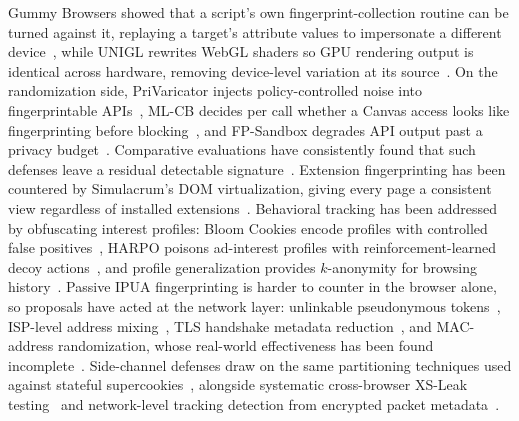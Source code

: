 %
Gummy Browsers showed that a script's own fingerprint-collection routine can be turned against it, replaying a target's attribute values to impersonate a different device~\cite{liuGummyBrowsersTargeted2022}, while UNIGL rewrites WebGL shaders so GPU rendering output is identical across hardware, removing device-level variation at its source~\cite{wuRenderedPrivateMaking2019}.
%
On the randomization side, PriVaricator injects policy-controlled noise into fingerprintable APIs~\cite{nikiforakisPriVaricatorDeceivingFingerprinters2015}, ML-CB decides per call whether a Canvas access looks like fingerprinting before blocking~\cite{reitingerMLCBMachineLearning2021}, and FP-Sandbox degrades API output past a privacy budget~\cite{torokOnlyPayWhat2023}.
%
Comparative evaluations have consistently found that such defenses leave a residual detectable signature~\cite{dattaEvaluatingAntiFingerprintingPrivacy2019}.
% 
Extension fingerprinting has been countered by Simulacrum's DOM virtualization, giving every page a consistent view regardless of installed extensions~\cite{karamiUnleashSimulacrumShifting2022}.
Behavioral tracking has been addressed by obfuscating interest profiles: Bloom Cookies encode profiles with controlled false positives~\cite{morBloomCookiesWeb2015}, HARPO poisons ad-interest profiles with reinforcement-learned decoy actions~\cite{zhangHARPOLearningSubvert2022}, and profile generalization provides $k$-anonymity for browsing history~\cite{zhuAnonymizingUserProfiles2010,zhengWebUserDeidentification2008}.
%
Passive IPUA fingerprinting is harder to counter in the browser alone, so proposals have acted at the network layer: unlinkable pseudonymous tokens~\cite{johnsonNymbleAnonymousIPAddress2007}, ISP-level address mixing~\cite{raghavanEnlistingISPsImprove2009}, TLS handshake metadata reduction~\cite{syEnhancedPerformancePrivacy2020}, and MAC-address randomization, whose real-world effectiveness has been found incomplete~\cite{fenskeThreeYearsLater2021}.
%
Side-channel defenses draw on the same partitioning techniques used against stateful supercookies~\cite{jacksonProtectingBrowserState2006}, alongside systematic cross-browser XS-Leak testing~\cite{knittelXSinatorcomFormalModel2021} and network-level tracking detection from encrypted packet metadata~\cite{leeNettrackGenericWeb2023}.




